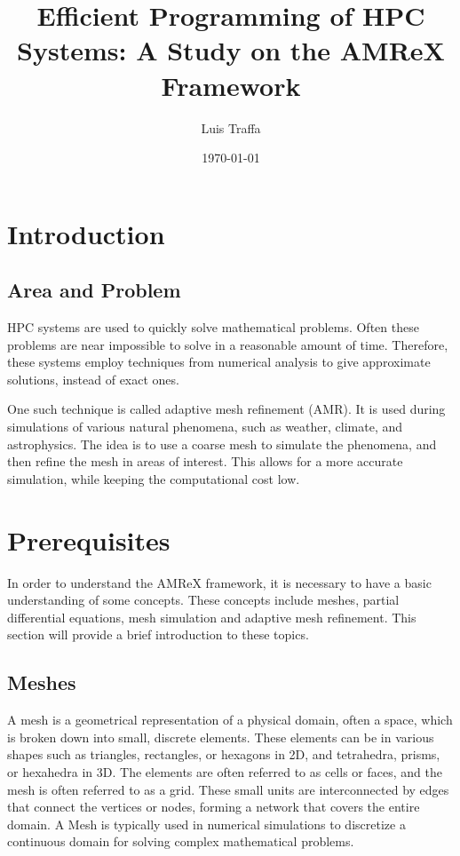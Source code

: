 \documentclass[12pt, a4paper]{scrartcl}
\title{Efficient Programming of HPC Systems: A Study on the AMReX Framework}
\author{Luis Traffa}
\date{\today}
\begin{document}
\maketitle
\clearpage

\tableofcontents
\clearpage

\section{Introduction}
\subsection{Area and Problem}

HPC systems are used to quickly solve mathematical problems. Often 
these problems are near impossible to solve in a reasonable amount of time.
Therefore, these systems employ techniques from numerical analysis to give approximate solutions,
instead of exact ones. 

One such technique is called adaptive mesh refinement (AMR). It is used during simulations of various natural 
phenomena, such as weather, climate, and astrophysics. The idea is to use a coarse mesh to simulate the
phenomena, and then refine the mesh in areas of interest. This allows for a more accurate simulation, while
keeping the computational cost low.

\section{Prerequisites}

In order to understand the AMReX framework, it is necessary to have a basic understanding of some concepts. 
These concepts include meshes, partial differential equations, mesh simulation and adaptive mesh refinement.
This section will provide a brief introduction to these topics.

\subsection{Meshes}

A mesh is a geometrical representation of a physical domain, often a space, 
which is broken down into small, discrete elements. These elements can be in various shapes 
such as triangles, rectangles, or hexagons in 2D, and tetrahedra, prisms, or hexahedra in 3D.
The elements are often referred to as cells or faces, and the mesh is often referred to as a grid.
These small units are interconnected by edges that connect the vertices or nodes, forming a network that covers the 
entire domain. A Mesh is typically used in numerical simulations to 
discretize a continuous domain for solving complex mathematical problems.
\end{document}
